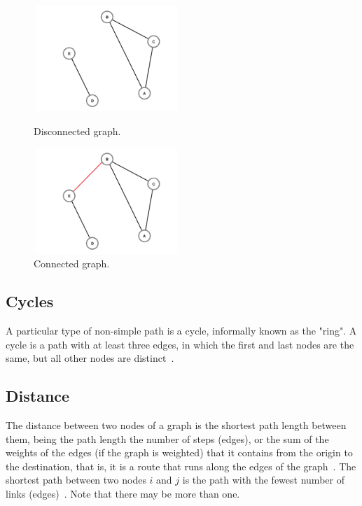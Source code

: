 \documentclass{article}
\begin{document}
\begin{multicols}{2}
\begin{figure}[hb]
\begin{minipage}[b]{0.5\linewidth}
\centering
\includegraphics[width=5.5cm,height=4cm]{Figures/graph_disconnected}
\caption{Disconnected graph.}
\label{fig:figure3}
\end{minipage}
\hspace{0.5cm}
\begin{minipage}[b]{0.4\linewidth}
\centering
\includegraphics[width=5.5cm,height=4cm]{Figures/graph_connected}
\caption{Connected graph.}
\label{fig:figure4}
\end{minipage}
\end{figure}


\subsection{Cycles}

A particular type of non-simple path is a cycle, informally known as the "ring". A cycle is a path with at least three edges, in which the first and last nodes are the same, but all other nodes are distinct~\cite{NCM}.


\subsection{Distance}

The distance between two nodes of a graph is the shortest path length between them, being the path length the number of steps (edges), or the sum of the weights of the edges (if the graph is weighted) that it contains from the origin to the destination, that is, it is a route that runs along the edges of the graph~\cite{NCM, NS}. The shortest path between two nodes $i$ and $j$ is the path with the fewest number of links (edges)~\cite{NS}. Note that there may be more than one.


\end{multicols}
\end{document}
